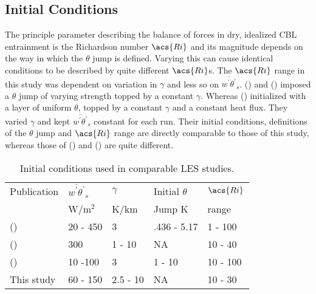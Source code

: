 \subsection{Initial Conditions}

The principle parameter describing the balance of forces in dry, idealized \acs{CBL} entrainment is the Richardson number $\acs{Ri}$ and its magnitude depends on the way in which the $\theta$ jump is defined.  Varying this can cause identical conditions to be described by quite different $\acs{Ri}$s.  The $\acs{Ri}$ range in this study was dependent on variation in $\gamma$ and less so on 
$\overline{w^{'}\theta^{'}}_{s}$.  \citeauthor{BrooksFowler2} (\citeyear{BrooksFowler2}) and \citeauthor{SullMoengStev} (\citeyear{SullMoengStev}) imposed a $\theta$ jump of varying strength topped by a constant $\gamma$.  Whereas \citeauthor{FedConzMir04} (\citeyear{FedConzMir04}) initialized with a layer of uniform $\theta$, topped by a constant $\gamma$ and a constant heat flux.  They varied $\gamma$ and kept $\overline{w^{'}\theta^{'}}_{s}$ constant for each run.  Their initial conditions, definitions of the $\theta$ jump and $\acs{Ri}$ range are directly comparable to those of this study, whereas those of \citeauthor{BrooksFowler2} (\citeyear{BrooksFowler2}) and \citeauthor{SullMoengStev} (\citeyear{SullMoengStev}) are quite different.\\    

\begin{table}[htbp]
\caption[]{Initial conditions used in comparable \acs{LES} studies.}

    \begin{center}
    \begin{tabular}{ p{4cm} p{1.4cm} p{1.4cm} p{1.7cm} p{1.8cm}}
Publication & $\overline{w^{'}\theta^{'}}_{s}$& $\gamma$& Initial $\theta$ & $\acs{Ri}$ \\ 
& W/m$^{2}$ & K/km & Jump K & range \\ \hline
      \citeauthor{SullMoengStev} (\citeyear{SullMoengStev}) & 20 - 450& 3  &.436 - 5.17 & 1 - 100\\ %
      \citeauthor{FedConzMir04} (\citeyear{FedConzMir04}) & 300 & 1 - 10 & NA & 10 - 40\\ %
      \citeauthor{BrooksFowler2} (\citeyear{BrooksFowler2}) &  10 -100 &  3& 1 - 10 &10 - 100 \\ %
      This study & 60 - 150 & 2.5 - 10& NA & 10 - 30\\ \hline 
      
    \end{tabular}
\label{table:initconditcomp}   
\end{center}    
\end{table}

